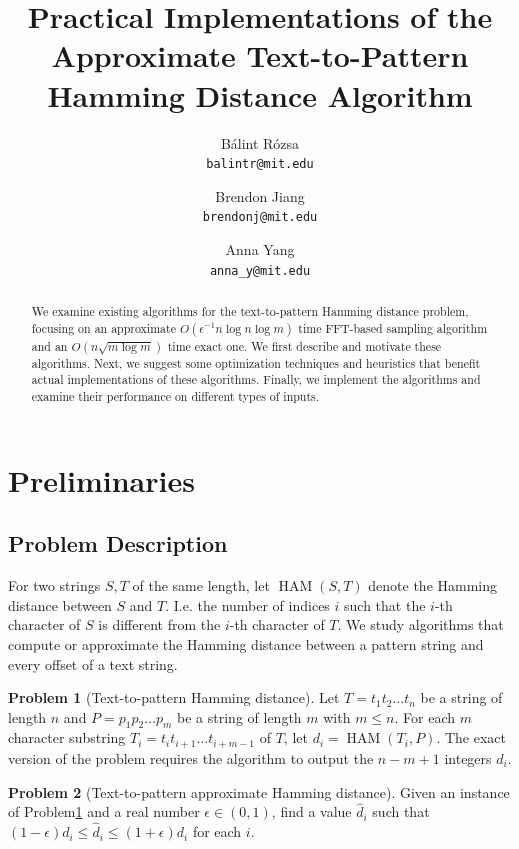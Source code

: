 \documentclass{article}
\title{Practical Implementations of the Approximate Text-to-Pattern Hamming Distance Algorithm}
\author{
    Bálint Rózsa\\ \texttt{balintr@mit.edu} \and
    Brendon Jiang\\ \texttt{brendonj@mit.edu} \and
    Anna Yang\\ \texttt{anna\_y@mit.edu}
}
\theoremstyle{definition}
\newtheorem{problem}{Problem}[section]
\newcommand{\op}{\operatorname}
\newcommand{\eps}{\epsilon}
\begin{document}
\maketitle

\begin{abstract}
We examine existing algorithms for the text-to-pattern Hamming distance problem, focusing on an approximate $O(\eps^{-1} n \log n \log m)$ time FFT-based sampling algorithm and an $O(n \sqrt{m \log m})$ time exact one.
We first describe and motivate these algorithms.
Next, we suggest some optimization techniques and heuristics that benefit actual implementations of these algorithms.
Finally, we implement the algorithms and examine their performance on different types of inputs.
\end{abstract}

\section{Preliminaries}
\subsection{Problem Description}

For two strings $S, T$ of the same length, let $\op{HAM}(S, T)$ denote the Hamming distance between $S$ and $T$.
I.e. the number of indices $i$ such that the $i$-th character of $S$ is different from the $i$-th character of $T$.
We study algorithms that compute or approximate the Hamming distance between a pattern string and every offset of a text string.

\begin{problem}[Text-to-pattern Hamming distance] \label{def:ham_exact}
    Let $T = t_1 t_2 \ldots t_n$ be a string of length $n$ and $P = p_1 p_2 \ldots p_m$ be a string of length $m$ with $m \leq n$.
    For each $m$ character substring $T_i = t_it_{i+1} \ldots t_{i+m-1}$ of $T$, let $d_i = \op{HAM}(T_i, P)$.
    The exact version of the problem requires the algorithm to output the $n-m+1$ integers $d_i$.
\end{problem}

\begin{problem}[Text-to-pattern approximate Hamming distance] \label{def:ham_approx}
    Given an instance of Problem\ref{def:ham_exact} and a real number $\eps \in (0, 1)$, find a value $\hat{d}_i$ such that $(1-\epsilon)d_i \leq \hat{d}_i \leq (1+\epsilon)d_i$ for each $i$.
\end{problem}
\end{document}
